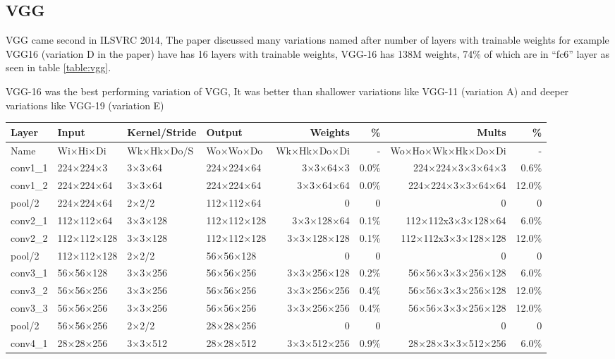 \subsection{VGG}
VGG\autocite{simonyan2014very} came second in ILSVRC 2014, 
The paper discussed many variations named after number of layers with trainable weights
for example VGG16 (variation D in the paper) have has 16 layers with trainable weights,
VGG-16 has 138M weights, 74\% of which are in ``fc6'' layer as seen in table \ref{table:vgg}.

VGG-16 was the best performing variation of VGG, It was better than shallower variations like VGG-11 (variation A)
and deeper variations like VGG-19 (variation E)

\clearpage
\begin{landscape}
\clearpage
\centering
\begin{table*}\caption{Analysis of VGG-16}\label{table:vgg}
\centering
\begin{tabularx}{\hsize}{Xlllrrrr}
\toprule
Layer & Input & Kernel/Stride & Output & Weights & \% & Mults & \% \\
\midrule
Name & Wi×Hi×Di & Wk×Hk×Do/S & Wo×Wo×Do & Wk×Hk×Do×Di & - & Wo×Ho×Wk×Hk×Do×Di & - \\
\midrule
conv1\_1 & 224×224×3 & 3×3×64 & 224×224×64 & 3×3×64×3 & 0.0\% &   224×224×3×3×64×3 & 0.6\% \\
conv1\_2 & 224×224×64 & 3×3×64 & 224×224×64 & 3×3×64×64 & 0.0\% & 224×224×3×3×64×64 & 12.0\% \\
pool/2 & 224×224×64 & 2×2/2 & 112×112×64 & 0 & 0 & 0 & 0 \\
conv2\_1 & 112×112×64  & 3×3×128 & 112×112×128 & 3×3×128×64 & 0.1\% & 112×112x3×3×128×64 & 6.0\% \\
conv2\_2 & 112×112×128 & 3×3×128 & 112×112×128 & 3×3×128×128 & 0.1\% & 112×112x3×3×128×128 & 12.0\% \\
pool/2 & 112×112×128 & 2×2/2 & 56×56×128 & 0 & 0 & 0 & 0 \\
conv3\_1 & 56×56×128 & 3×3×256 & 56×56×256 & 3×3×256×128 & 0.2\% & 56×56×3×3×256×128 & 6.0\% \\
conv3\_2 & 56×56×256 & 3×3×256 & 56×56×256 & 3×3×256×256 & 0.4\% & 56×56×3×3×256×128 & 12.0\% \\
conv3\_3 & 56×56×256 & 3×3×256 & 56×56×256 & 3×3×256×256 & 0.4\% & 56×56×3×3×256×128 & 12.0\% \\
pool/2 & 56×56×256 & 2×2/2 & 28×28×256 & 0 & 0 & 0 & 0 \\
conv4\_1 & 28×28×256 & 3×3×512 & 28×28×512 & 3×3×512×256 & 0.9\% & 28×28×3×3×512×256 & 6.0\% \\

\end{tabularx}
\end{table*}
\end{landscape}
